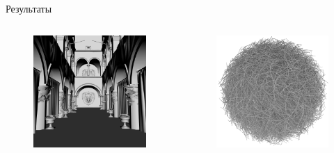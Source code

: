 \documentclass{beamer}
\begin{document}
\begin{frame}[t]{Результаты}
\begin{columns}
        \begin{figure}
            \includegraphics[keepaspectratio, width=\textwidth]{res/sponza.png}
        \end{figure}
        \begin{figure}
            \includegraphics[keepaspectratio, width=\textwidth]{res/hairball.png}
        \end{figure}


\end{columns}
\end{frame}
\end{document}
